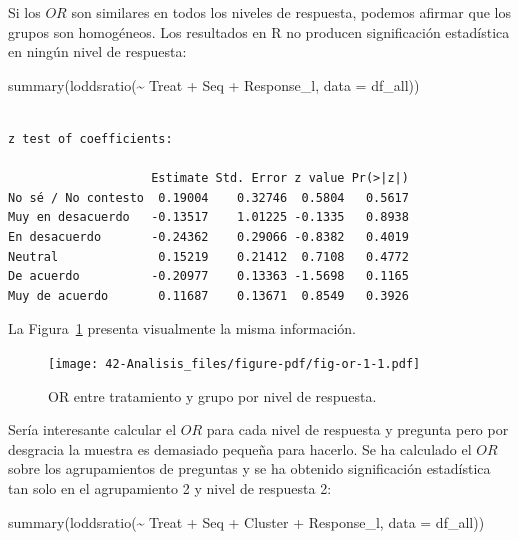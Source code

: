 \documentclass[
  12pt,
  a4paper,
  extrafontsizes,
  onecolumn,
  openright]{memoir}
\newenvironment{Shaded}{\begin{snugshade}}{\end{snugshade}}
\newcommand{\AttributeTok}[1]{\textcolor[rgb]{0.40,0.45,0.13}{#1}}
\newcommand{\FunctionTok}[1]{\textcolor[rgb]{0.28,0.35,0.67}{#1}}
\newcommand{\NormalTok}[1]{\textcolor[rgb]{0.00,0.23,0.31}{#1}}
\newcommand{\SpecialCharTok}[1]{\textcolor[rgb]{0.37,0.37,0.37}{#1}}
\begin{document}
Si los \(OR\) son similares en todos los niveles de respuesta, podemos
afirmar que los grupos son homogéneos. Los resultados en R no producen
significación estadística en ningún nivel de respuesta:

\scriptsize

\begin{Shaded}
\begin{Highlighting}[]
\FunctionTok{summary}\NormalTok{(}\FunctionTok{loddsratio}\NormalTok{(}\SpecialCharTok{\textasciitilde{}}\NormalTok{ Treat }\SpecialCharTok{+}\NormalTok{ Seq }\SpecialCharTok{+}\NormalTok{ Response\_l, }\AttributeTok{data =}\NormalTok{ df\_all))}
\end{Highlighting}
\end{Shaded}

\begin{verbatim}

z test of coefficients:

                    Estimate Std. Error z value Pr(>|z|)
No sé / No contesto  0.19004    0.32746  0.5804   0.5617
Muy en desacuerdo   -0.13517    1.01225 -0.1335   0.8938
En desacuerdo       -0.24362    0.29066 -0.8382   0.4019
Neutral              0.15219    0.21412  0.7108   0.4772
De acuerdo          -0.20977    0.13363 -1.5698   0.1165
Muy de acuerdo       0.11687    0.13671  0.8549   0.3926
\end{verbatim}

\normalsize

La Figura~\ref{fig-or-1} presenta visualmente la misma información.

\begin{figure}[h]

{\centering \texttt{[image: 42-Analisis\_files/figure-pdf/fig-or-1-1.pdf]}

}

\caption{\label{fig-or-1}OR entre tratamiento y grupo por nivel de
respuesta.}

\end{figure}

Sería interesante calcular el \(OR\) para cada nivel de respuesta y
pregunta pero por desgracia la muestra es demasiado pequeña para
hacerlo. Se ha calculado el \(OR\) sobre los agrupamientos de preguntas
y se ha obtenido significación estadística tan solo en el agrupamiento 2
y nivel de respuesta 2:

\scriptsize

\begin{Shaded}
\begin{Highlighting}[]
\FunctionTok{summary}\NormalTok{(}\FunctionTok{loddsratio}\NormalTok{(}\SpecialCharTok{\textasciitilde{}}\NormalTok{ Treat }\SpecialCharTok{+}\NormalTok{ Seq }\SpecialCharTok{+}\NormalTok{ Cluster }\SpecialCharTok{+}\NormalTok{ Response\_l, }\AttributeTok{data =}\NormalTok{ df\_all))}
\end{Highlighting}
\end{Shaded}
\end{document}
